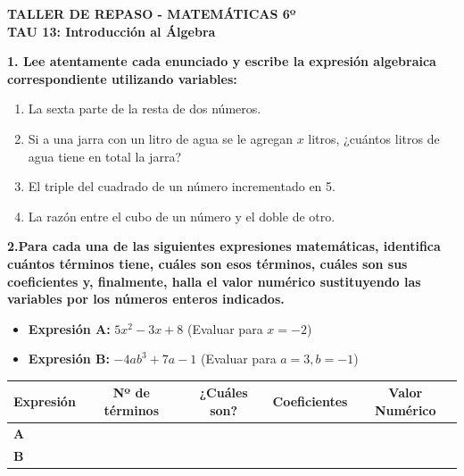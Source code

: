 \documentclass[11pt, a4paper]{article}
\begin{document}
\begin{center}
    \textbf{\Large TALLER DE REPASO - MATEMÁTICAS 6º}\\[0.2cm]
    \textbf{\large TAU 13: Introducción al Álgebra}
\end{center}
\vspace{0.8cm}

\noindent \textbf{1.
Lee atentamente cada enunciado y escribe la expresión algebraica correspondiente utilizando variables:}
\begin{enumerate}[label=\alph*), itemsep=0.4cm]
    \item La sexta parte de la resta de dos números.
    \item Si a una jarra con un litro de agua se le agregan $x$ litros, ¿cuántos litros de agua tiene en total la jarra?
    \item El triple del cuadrado de un número incrementado en 5.
    \item La razón entre el cubo de un número y el doble de otro.
\end{enumerate}


\noindent \textbf{2.Para cada una de las siguientes expresiones matemáticas, identifica cuántos términos tiene, cuáles son esos términos, cuáles son sus coeficientes y, finalmente, halla el valor numérico sustituyendo las variables por los números enteros indicados.}
\begin{itemize}
    \item \textbf{Expresión A:} $5x^2 - 3x + 8$ \quad (Evaluar para $x = -2$)
    \item \textbf{Expresión B:} $-4ab^3 + 7a - 1$ \quad (Evaluar para $a = 3, b = -1$)
\end{itemize}

\vspace{0.3cm}
\begin{center}
    \renewcommand{\arraystretch}{1.5}
    \begin{tabular}{l c c c c}
        \toprule
        \textbf{Expresión} & \textbf{Nº de términos} & \textbf{¿Cuáles son?} & \textbf{Coeficientes} & \textbf{Valor Numérico} \\
        \midrule
        \textbf{A} & & & & \\
        \midrule
        \textbf{B} & & & & \\
        \bottomrule
    \end{tabular}
\end{center}
\end{document}
